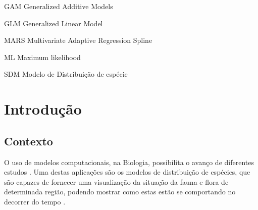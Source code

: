 \documentclass[
    12pt,               %
    openright,          %
    oneside,            %
    a4paper,            %
    english,            %
    brazil              %
    ]{abntex2}
\begin{document}
\listoffigures*
\cleardoublepage

\listoftables*
\cleardoublepage

\begin{siglas}
  \item[GAM] Generalized Additive Models
  \item[GLM] Generalized Linear Model
  \item[MARS] Multivariate Adaptive Regression Spline
  \item[ML] Maximum likelihood
  \item[SDM] Modelo de Distribuição de espécie
\end{siglas}

\tableofcontents*
\cleardoublepage

\textual
\chapter{Introdução}

\section{Contexto}

O uso de modelos computacionais, na Biologia, possibilita o avanço de diferentes estudos \cite{modelagem_comp}. Uma destas aplicações são os modelos de distribuição 
de espécies, que são capazes de fornecer uma visualização da situação 
da fauna e flora de determinada região, podendo mostrar como estas estão se 
comportando no decorrer do tempo \cite{speciesDistributionModels}.
\end{document}
